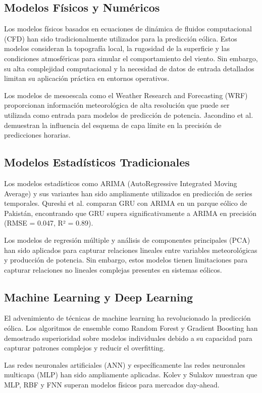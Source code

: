 \documentclass[conference]{IEEEtran}
\begin{document}
	\subsection{Modelos Físicos y Numéricos}
	Los modelos físicos basados en ecuaciones de dinámica de fluidos computacional (CFD) han sido tradicionalmente utilizados para la predicción eólica. Estos modelos consideran la topografía local, la rugosidad de la superficie y las condiciones atmosféricas para simular el comportamiento del viento. Sin embargo, su alta complejidad computacional y la necesidad de datos de entrada detallados limitan su aplicación práctica en entornos operativos.
	
	Los modelos de mesoescala como el Weather Research and Forecasting (WRF) proporcionan información meteorológica de alta resolución que puede ser utilizada como entrada para modelos de predicción de potencia. Jacondino et al. \cite{jacondino2021hourly} demuestran la influencia del esquema de capa límite en la precisión de predicciones horarias.
	
	\subsection{Modelos Estadísticos Tradicionales}
	Los modelos estadísticos como ARIMA (AutoRegressive Integrated Moving Average) y sus variantes han sido ampliamente utilizados en predicción de series temporales. Qureshi et al. \cite{qureshi2023shortterm} comparan GRU con ARIMA en un parque eólico de Pakistán, encontrando que GRU supera significativamente a ARIMA en precisión (RMSE = 0.047, R² = 0.89).
	
	Los modelos de regresión múltiple y análisis de componentes principales (PCA) han sido aplicados para capturar relaciones lineales entre variables meteorológicas y producción de potencia. Sin embargo, estos modelos tienen limitaciones para capturar relaciones no lineales complejas presentes en sistemas eólicos.
	
	\subsection{Machine Learning y Deep Learning}
	El advenimiento de técnicas de machine learning ha revolucionado la predicción eólica. Los algoritmos de ensemble como Random Forest y Gradient Boosting han demostrado superioridad sobre modelos individuales debido a su capacidad para capturar patrones complejos y reducir el overfitting.
	
	Las redes neuronales artificiales (ANN) y específicamente las redes neuronales multicapa (MLP) han sido ampliamente aplicadas. Kolev y Sulakov \cite{kolev2019forecasting} muestran que MLP, RBF y FNN superan modelos físicos para mercados day-ahead.
	
\end{document}
